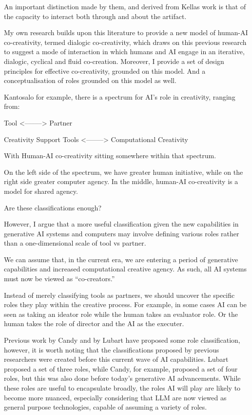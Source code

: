An important distinction made by them, and derived from Kellas work is that of the capacity to interact both through and about the artifact. 

My own research builds upon this literature to provide a new model of human-AI co-creativity, termed dialogic co-creativity, which draws on this previous research to suggest a mode of interaction in which humans and AI engage in an iterative, dialogic, cyclical and fluid co-creation. Moreover, I provide a set of design principles for effective co-creativity, grounded on this model. And a conceptualisation of roles grounded on this model as well. 



Kantosalo for example, there is a spectrum for AI’s role in creativity, ranging from:

	Tool <–––––> Partner

Creativity Support Tools <–––––> Computational Creativity 

With Human-AI co-creativity sitting somewhere within that spectrum. 



On the left side of the spectrum, we have greater human initiative, while on the right side greater computer agency. In the middle, human-AI co-creativity is a model for shared agency. 

Are these classifications enough?

However, I argue that a more useful classification given the new capabilities in generative AI systems and computers may involve defining various roles rather than a one-dimensional scale of tool vs partner.

We can assume that, in the current era, we are entering a period of generative capabilities and increased computational creative agency. As such, all AI systems must now be viewed as “co-creators.”

Instead of merely classifying tools as partners, we should uncover the specific roles they play within the creative process. For example, in some cases AI can be seen as taking an ideator role while the human takes an evaluator role. Or the human takes the role of director and the AI as the executer. 

Previous work by Candy and by Lubart have proposed some role classification, however, it is worth noting that the classifications proposed by previous researchers were created before this current wave of AI capabilities. Lubart proposed a set of three roles, while Candy, for example, proposed a set of four roles, but this was also done before today’s generative AI advancements. While these roles are useful to encapsulate broadly, the roles AI will play are likely to become more nuanced, especially considering that LLM are now viewed as general purpose technologies, capable of assuming a variety of roles. 

